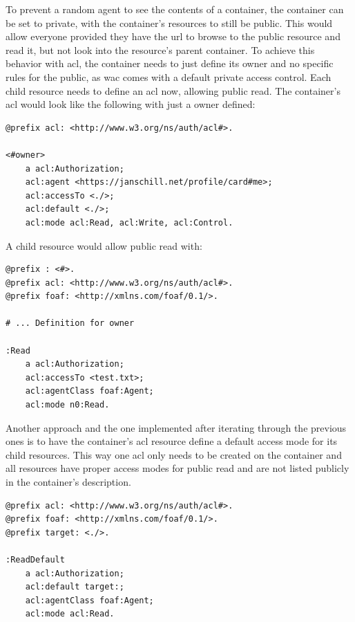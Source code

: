 To prevent a random agent to see the contents of a container, the container can be set to private, with the container’s resources to still be public. This would allow everyone provided they have the \gls{url} to browse to the public resource and read it, but not look into the resource’s parent container. To achieve this behavior with \gls{acl}, the container needs to just define its owner and no specific rules for the public, as \gls{wac} comes with a default private access control. Each child resource needs to define an \gls{acl} now, allowing public read.
The container’s \gls{acl} would look like the following with just a owner defined:

\begin{lstlisting}[language=Other,columns=fullflexible, caption={TODO: Label caption}, label={lst:2}]
@prefix acl: <http://www.w3.org/ns/auth/acl#>.

<#owner>
    a acl:Authorization;
    acl:agent <https://janschill.net/profile/card#me>;
    acl:accessTo <./>;
    acl:default <./>;
    acl:mode acl:Read, acl:Write, acl:Control.
\end{lstlisting}

A child resource would allow public read with:

\begin{lstlisting}[language=Other,columns=fullflexible, caption={TODO: Label caption}, label={lst:3}]
@prefix : <#>.
@prefix acl: <http://www.w3.org/ns/auth/acl#>.
@prefix foaf: <http://xmlns.com/foaf/0.1/>.

# ... Definition for owner

:Read
    a acl:Authorization;
    acl:accessTo <test.txt>;
    acl:agentClass foaf:Agent;
    acl:mode n0:Read.
\end{lstlisting}

Another approach and the one implemented after iterating through the previous ones is to have the container’s \gls{acl} resource define a default access mode for its child resources. This way one \gls{acl} only needs to be created on the container and all resources have proper access modes for public read and are not listed publicly in the container’s description.

\begin{lstlisting}[language=Other,columns=fullflexible, caption={TODO: Label caption}, label={lst:4}]
@prefix acl: <http://www.w3.org/ns/auth/acl#>.
@prefix foaf: <http://xmlns.com/foaf/0.1/>.
@prefix target: <./>.

:ReadDefault
    a acl:Authorization;
    acl:default target:;
    acl:agentClass foaf:Agent;
    acl:mode acl:Read.
\end{lstlisting}

